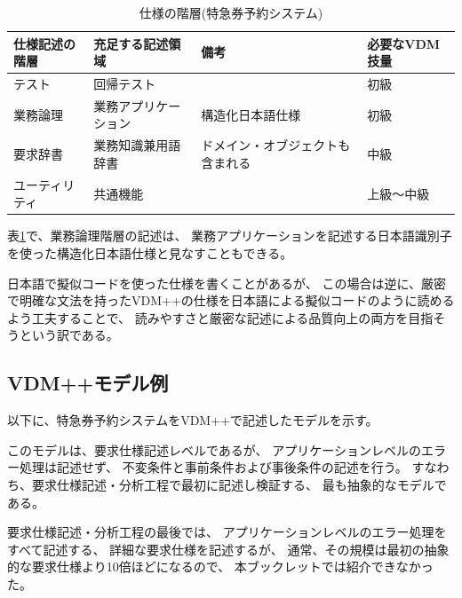\begin{table}[h]
	\caption[仕様の階層(特急券予約システム)]{仕様の階層(特急券予約システム)}
	\label{SpecLevel1}
	\begin{center}
		\setlength{\tabcolsep}{3pt}
		\begin{tabular}{|l|l|l|l|} \hline
			仕様記述の階層 & 充足する記述領域 & 備考 & 必要なVDM技量  \\ \hline\hline
			テスト & 回帰テスト & & 初級 \\ \hline
			業務論理 & 業務アプリケーション &  構造化日本語仕様 & 初級\\ \hline
			要求辞書 & 業務知識兼用語辞書 & ドメイン・オブジェクトも含まれる & 中級 \\ \hline
			ユーティリティ & 共通機能 & & 上級〜中級 \\ \hline
		\end{tabular}
	\end{center}
\end{table}

表\ref{SpecLevel1}で、業務論理階層の記述は、
業務アプリケーションを記述する日本語識別子を使った構造化日本語仕様と見なすこともできる。

日本語で擬似コードを使った仕様を書くことがあるが、
この場合は逆に、厳密で明確な文法を持ったVDM++の仕様を日本語による擬似コードのように読めるよう工夫することで、
読みやすさと厳密な記述による品質向上の両方を目指そうという訳である。


\subsection {VDM++モデル例}	
	\label{VDMModelExpressReservation}

以下に、特急券予約システムをVDM++で記述したモデルを示す。

このモデルは、要求仕様記述レベルであるが、
アプリケーションレベルのエラー処理は記述せず、
不変条件と事前条件および事後条件の記述を行う。
すなわち、要求仕様記述・分析工程で最初に記述し検証する、
最も抽象的なモデルである。

要求仕様記述・分析工程の最後では、
アプリケーションレベルのエラー処理をすべて記述する、
詳細な要求仕様を記述するが、
通常、その規模は最初の抽象的な要求仕様より10倍ほどになるので、
本ブックレットでは紹介できなかった。

